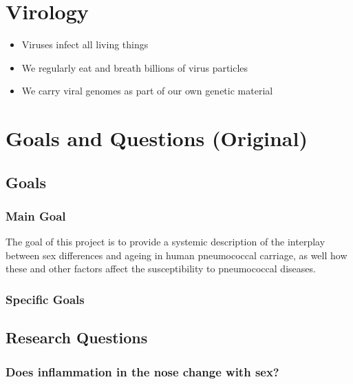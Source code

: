 \documentclass[
]{book}
\begin{document}
\hypertarget{virology}{%
\chapter{Virology}\label{virology}}

\begin{itemize}
\item
  Viruses infect all living things
\item
  We regularly eat and breath billions of virus particles
\item
  We carry viral genomes as part of our own genetic material
\end{itemize}

\hypertarget{goals-and-questions-original}{%
\chapter{Goals and Questions (Original)}\label{goals-and-questions-original}}

\hypertarget{goals}{%
\section{Goals}\label{goals}}

\hypertarget{main-goal}{%
\subsection{Main Goal}\label{main-goal}}

The goal of this project is to provide a systemic description of the interplay between sex differences and ageing in human pneumococcal carriage, as well how these and other factors affect the susceptibility to pneumococcal diseases.

\hypertarget{specific-goals}{%
\subsection{Specific Goals}\label{specific-goals}}

\hypertarget{research-questions-1}{%
\section{Research Questions}\label{research-questions-1}}

\hypertarget{does-inflammation-in-the-nose-change-with-sex}{%
\subsection{Does inflammation in the nose change with sex?}\label{does-inflammation-in-the-nose-change-with-sex}}
\end{document}
